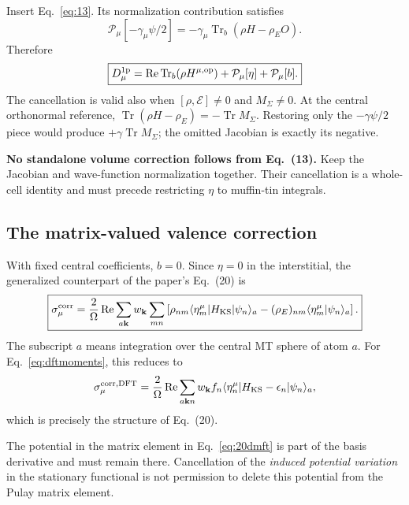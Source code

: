 \documentclass[11pt]{article}
\newcommand{\Tr}{\operatorname{Tr}}
\newcommand{\Rea}{\operatorname{Re}}
\newcommand{\kb}{\mathbf k}
\newcommand{\Es}{\mathcal E}
\newcommand{\rE}{{\rho_E}}
\newcommand{\ip}[2]{\langle #1|#2\rangle}
\newcommand{\me}[3]{\langle #1|#2|#3\rangle}
\newcommand{\note}[2]{\par\medskip\noindent\colorbox{#1}{\parbox{\dimexpr\linewidth-2\fboxsep\relax}{#2}}\par\medskip}
\newcommand{\key}[1]{\note{pale}{#1}}
\begin{document}
Insert Eq.~\eqref{eq:13}. Its normalization contribution satisfies
\begin{equation}
 \mathcal P_\mu[-\gamma_\mu\psi/2]
       =-\gamma_\mu\Tr_b(\rho H-\rE O).
 \label{eq:volcancel}
\end{equation}
Therefore
\begin{equation}
 \boxed{D_\mu^{\rm 1p}=\Rea\Tr_b(\rho H^{\mu,\rm op})
                        +\mathcal P_\mu[\eta]
                        +\mathcal P_\mu[b].}
 \label{eq:postvolume}
\end{equation}
The cancellation is valid also when $[\rho,\Es]\ne0$ and
$M_\Sigma\ne0$. At the central orthonormal reference,
$\Tr(\rho H-\rE)=-\Tr M_\Sigma$. Restoring only the
$-\gamma\psi/2$ piece would produce $+\gamma\Tr M_\Sigma$;
the omitted Jacobian is exactly its negative.

\key{\textbf{No standalone volume correction follows from Eq.\ (13).}
Keep the Jacobian and wave-function normalization together. Their
cancellation is a whole-cell identity and must precede restricting
$\eta$ to muffin-tin integrals.}

\subsection{The matrix-valued valence correction}
With fixed central coefficients, $b=0$. Since $\eta=0$ in the
interstitial, the generalized counterpart of the paper's Eq.\ (20) is
\begin{equation}
 \boxed{\sigma_\mu^{\rm corr}=
 \frac{2}{\Omega}\Rea\sum_{a\kb}w_\kb\sum_{mn}
 \left[\rho_{nm}\me{\eta_m^\mu}{H_{\rm KS}}{\psi_n}_a
       -(\rE)_{nm}\ip{\eta_m^\mu}{\psi_n}_a\right].}
 \label{eq:20dmft}
\end{equation}
The subscript $a$ means integration over the central MT sphere of atom $a$.
For Eq.~\eqref{eq:dftmoments}, this reduces to
\begin{equation}
 \sigma_\mu^{\rm corr,DFT}
 =\frac{2}{\Omega}\Rea\sum_{a\kb n}w_\kb f_n
       \me{\eta_n^\mu}{H_{\rm KS}-\epsilon_n}{\psi_n}_a,
 \label{eq:20dft}
\end{equation}
which is precisely the structure of Eq.\ (20).

The potential in the matrix element in Eq.~\eqref{eq:20dmft} is part
of the basis derivative and must remain there. Cancellation of the
\emph{induced potential variation} in the stationary functional is not
permission to delete this potential from the Pulay matrix element.
\end{document}
